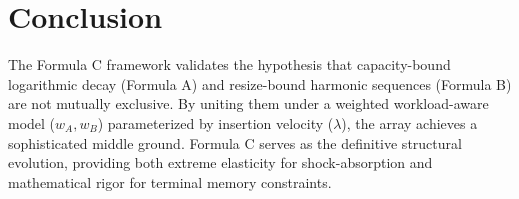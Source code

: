 \documentclass[11pt, a4paper]{article}
\begin{document}
\section{Conclusion}
The Formula C framework validates the hypothesis that capacity-bound logarithmic decay (Formula A) and resize-bound harmonic sequences (Formula B) are not mutually exclusive. By uniting them under a weighted workload-aware model ($w_A, w_B$) parameterized by insertion velocity ($\lambda$), the array achieves a sophisticated middle ground. Formula C serves as the definitive structural evolution, providing both extreme elasticity for shock-absorption and mathematical rigor for terminal memory constraints.
\end{document}
